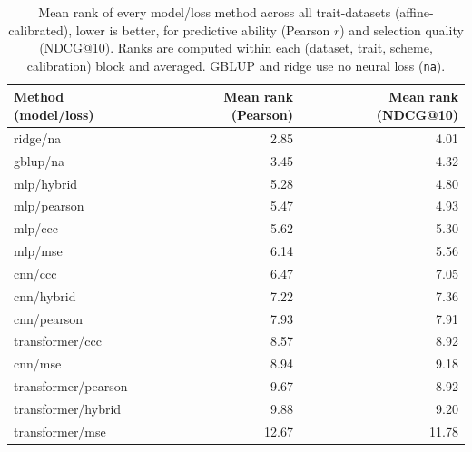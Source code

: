 \begin{table}[ht]
\caption{Mean rank of every model/loss method across all trait-datasets (affine-calibrated), lower is better, for predictive ability (Pearson $r$) and selection quality (NDCG@10). Ranks are computed within each (dataset, trait, scheme, calibration) block and averaged. GBLUP and ridge use no neural loss (\texttt{na}).}
\label{tab:S-ranks}
\begin{tabular}{lrr}
\toprule
Method (model/loss) & Mean rank (Pearson) & Mean rank (NDCG@10) \\
\midrule
ridge/na & 2.85 & 4.01 \\
gblup/na & 3.45 & 4.32 \\
mlp/hybrid & 5.28 & 4.80 \\
mlp/pearson & 5.47 & 4.93 \\
mlp/ccc & 5.62 & 5.30 \\
mlp/mse & 6.14 & 5.56 \\
cnn/ccc & 6.47 & 7.05 \\
cnn/hybrid & 7.22 & 7.36 \\
cnn/pearson & 7.93 & 7.91 \\
transformer/ccc & 8.57 & 8.92 \\
cnn/mse & 8.94 & 9.18 \\
transformer/pearson & 9.67 & 8.92 \\
transformer/hybrid & 9.88 & 9.20 \\
transformer/mse & 12.67 & 11.78 \\
\bottomrule
\end{tabular}
\end{table}
